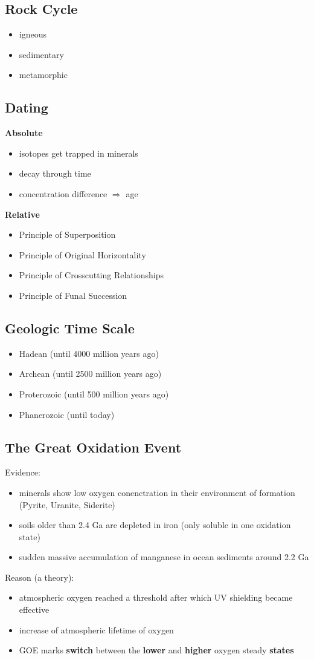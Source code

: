 \documentclass{article}
\theoremstyle{sltheorem}
\begin{document}
\subsection{Rock Cycle}
\begin{itemize}
    \item igneous
    \item sedimentary
    \item metamorphic
\end{itemize}
\subsection{Dating}
\textbf{Absolute}
\begin{itemize}
    \item isotopes get trapped in minerals
    \item decay through time
    \item concentration difference $\Rightarrow$ age
\end{itemize}
\textbf{Relative}
\begin{itemize}
    \item Principle of Superposition
    \item Principle of Original Horizontality
    \item Principle of Crosscutting Relationships
    \item Principle of Funal Succession
\end{itemize}
\subsection{Geologic Time Scale}
\begin{itemize}
    \item Hadean (until 4000 million years ago)
    \item Archean (until 2500 million years ago)
    \item Proterozoic (until 500 million years ago)
    \item Phanerozoic (until today)
\end{itemize}
\subsection{The Great Oxidation Event}
Evidence:
\begin{itemize}
    \item minerals show low oxygen conenctration in their environment of formation (Pyrite, Uranite, Siderite)
    \item soils older than 2.4 Ga are depleted in iron (only soluble in one oxidation state)
    \item sudden massive accumulation of manganese in ocean sediments around 2.2 Ga
\end{itemize}
Reason (a theory):
\begin{itemize}
    \item atmospheric oxygen reached a threshold after which UV shielding became effective
    \item increase of atmospheric lifetime of oxygen
    \item GOE marks \textbf{switch} between the \textbf{lower} and \textbf{higher} oxygen steady \textbf{states}
\end{itemize}
\end{document}
